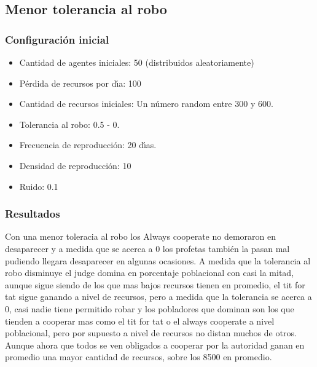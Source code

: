 \documentclass{article}
\begin{document}
\begin{figure}[h]
\begin{minipage}{0.32\textwidth}
      \end{minipage}
\end{figure}


\subsection{Menor tolerancia al robo}
\subsubsection{Configuraci\'on inicial}
\begin{itemize}
      \item Cantidad de agentes iniciales: 50 (distribuidos aleatoriamente)
      \item P\'erdida de recursos por d\'{\i}a: 100
      \item Cantidad de recursos iniciales: Un n\'umero random entre 300 y 600.
      \item Tolerancia al robo: 0.5 - 0.
      \item Frecuencia de reproducci\'on: 20 d\'{\i}as.
      \item Densidad de reproducci\'on: 10
      \item Ruido: 0.1
\end{itemize}
\subsubsection{Resultados}
Con una menor toleracia al robo los Always cooperate no demoraron en desaparecer y a medida que se acerca a 0 los profetas también la pasan mal pudiendo llegara desaparecer
en algunas ocasiones. A medida que la tolerancia al robo disminuye el judge domina en porcentaje poblacional con casi la mitad, aunque sigue siendo de los que mas bajos recursos
tienen en promedio, el tit for tat sigue ganando a nivel de recursos, pero a medida que la tolerancia se acerca a 0, casi nadie tiene permitido robar y los pobladores que dominan
son los que tienden a cooperar mas como el tit for tat o el always cooperate a nivel poblacional, pero por supuesto a nivel de recursos no distan muchos de otros. Aunque ahora que todos
se ven obligados a cooperar por la autoridad ganan en promedio una mayor cantidad de recursos, sobre los 8500 en promedio.
\end{document}
